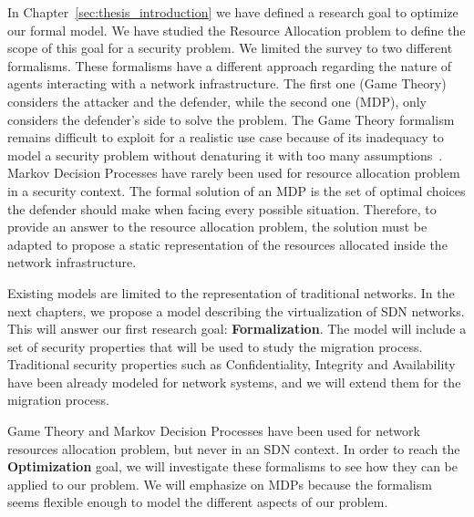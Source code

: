 In Chapter~\ref{sec:thesis_introduction} we have defined a research goal to optimize our formal model. 
We have studied the Resource Allocation problem to define the scope of this goal for a security problem.
We limited the survey to two different formalisms. These formalisms have a different approach regarding the nature of agents interacting with a network infrastructure. The first one (\ie Game Theory) considers the attacker and the defender, while the second one (\ie MDP), only considers the defender's side to solve the problem.
The Game Theory formalism remains difficult to exploit for a realistic use case because of its inadequacy to model a security problem without denaturing it with too many assumptions~\cite{Kiennert2018}.
Markov Decision Processes have rarely been used for resource allocation problem in a security context. The formal solution of an MDP is the set of optimal choices the defender should make when facing every possible situation. Therefore, to provide an answer to the resource allocation problem, the solution must be adapted to propose a static representation of the resources allocated inside the network infrastructure.

Existing models are limited to the representation of traditional networks.
In the next chapters, we propose a model describing the virtualization of SDN networks. This will answer our first research goal: \textbf{Formalization}. The model will include a set of security properties that will be used to study the migration process. Traditional security properties such as Confidentiality, Integrity and Availability have been already modeled for network systems, and we will extend them for the migration process.

Game Theory and Markov Decision Processes have been used for network resources allocation problem, but never in an SDN context. In order to reach the \textbf{Optimization} goal, we will investigate these formalisms to see how they can be applied to our problem. We will emphasize on MDPs because the formalism seems flexible enough to model the different aspects of our problem.


